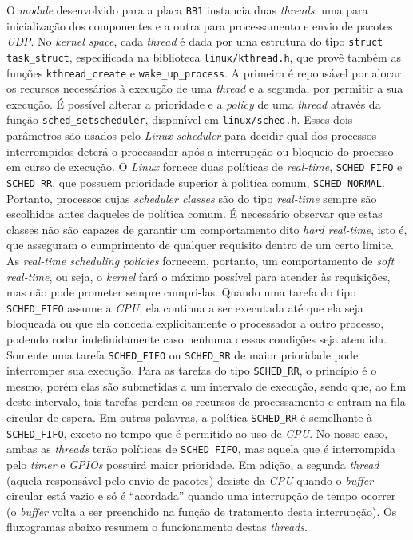 O \textit{module} desenvolvido para a placa \texttt{BB1} instancia duas
\textit{threads}: uma para inicialização dos componentes e a outra para
processamento e envio de pacotes \textit{UDP}. No \textit{kernel space}, cada
\textit{thread} é dada por uma estrutura do tipo \texttt{struct task\_struct},
especificada na biblioteca \texttt{linux/kthread.h}, que provê também as funções
\texttt{kthread\_create} e \texttt{wake\_up\_process}. A primeira é reponsável
por alocar os recursos necessários à execução de uma \textit{thread} e a
segunda, por permitir a sua execução. É possível alterar a prioridade e a
\textit{policy} de uma \textit{thread} através da função
\texttt{sched\_setscheduler}, disponível em \texttt{linux/sched.h}. Esses dois
parâmetros são usados pelo \textit{Linux scheduler} para decidir qual dos
processos interrompidos deterá o processador após a interrupção ou bloqueio do
processo em curso de execução. O \textit{Linux} fornece duas políticas de
\textit{real-time}, \texttt{SCHED\_FIFO} e \texttt{SCHED\_RR}, que possuem
prioridade superior à politíca comum, \texttt{SCHED\_NORMAL}. Portanto,
processos cujas \textit{scheduler classes} são do tipo \textit{real-time} sempre
são escolhidos antes daqueles de política comum. É necessário observar que estas
classes não são capazes de garantir um comportamento dito \textit{hard
real-time}, isto é, que asseguram o cumprimento de qualquer requisito dentro de
um certo limite. As \textit{real-time scheduling policies} fornecem, portanto,
um comportamento de \textit{soft real-time}, ou seja, o \textit{kernel} fará o
máximo possível para atender às requisições, mas não pode prometer sempre
cumpri-las. Quando uma tarefa do tipo \texttt{SCHED\_FIFO} assume a
\textit{CPU}, ela continua a ser executada até que ela seja bloqueada ou que ela conceda
explicitamente o processador a outro processo, podendo rodar indefinidamente
caso nenhuma dessas condições seja atendida. Somente uma tarefa
\texttt{SCHED\_FIFO} ou \texttt{SCHED\_RR} de maior prioridade pode interromper
sua execução. Para as tarefas do tipo \texttt{SCHED\_RR}, o princípio é o mesmo,
porém elas são submetidas a um intervalo de execução, sendo que, ao fim deste
intervalo, tais tarefas perdem os recursos de processamento e entram na fila
circular de espera. Em outras palavras, a política \texttt{SCHED\_RR} é
semelhante à \texttt{SCHED\_FIFO}, exceto no tempo que é permitido ao uso de
\textit{CPU}. No nosso caso, ambas as \textit{threads} terão políticas de
\texttt{SCHED\_FIFO}, mas aquela que é interrompida pelo \textit{timer} e
\textit{GPIOs} possuirá maior prioridade. Em adição, a segunda \textit{thread}
(aquela responsável pelo envio de pacotes) desiste da \textit{CPU} quando o
\textit{buffer} circular está vazio e só é ``acordada'' quando uma interrupção
de tempo ocorrer (o \textit{buffer} volta a ser preenchido na função de
tratamento desta interrupção). Os fluxogramas abaixo resumem o funcionamento
destas \textit{threads}.

